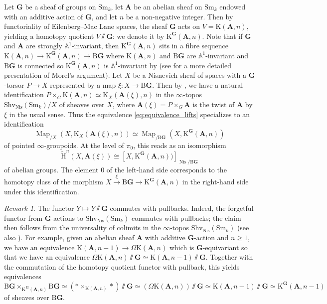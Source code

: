 \documentclass[11pt,leqno]{amsart}
\renewcommand{\1}{{\rm 1\hspace*{-0.4ex}%
\rule{0.1ex}{1.52ex}\hspace*{0.2ex}}}
\newcommand{\Nis}{{\operatorname{Nis}}}
\newcommand{\Shv}{{\mathrm{Shv}}}
\newcommand{\Sm}{\mathrm{Sm}}
\newcommand{\Hr}{{\mathrm {H}}}
\newcommand{\<}[1]{{\langle}#1 {\rangle}}
\newcommand{\Kr}{\mathrm{K}}
\newcommand{\Abf}{\mathbf{A}}
\newcommand{\Abb}{\mathbb{A}}
\newcommand{\Gbf}{\mathbf{G}}
\newcommand{\Br}{\mathrm{B}}
\newcommand{\Map}{\operatorname{Map}}
\theoremstyle{plain}
\theoremstyle{definition}
\theoremstyle{remark}
\newtheorem{rem}[thm]{Remark}
\numberwithin{equation}{section}
\begin{document}
Let $\Gbf$ be a sheaf of groups on $\Sm_k$, let $\Abf$ be an abelian sheaf on $\Sm_k$ endowed with an additive action of $\Gbf$, and let $n$ be a non-negative integer. Then by functoriality of Eilenberg--Mac Lane spaces, the sheaf $\Gbf$ acts on $V=\Kr(\Abf,n)$, yielding a homotopy quotient $V\sslash\Gbf$: we denote it by $\Kr^\Gbf(\Abf,n)$. Note that if $\Gbf$ and $\Abf$ are strongly $\Abb^1$-invariant, then $\Kr^\Gbf(\Abf,n)$ sits in a fibre sequence $\Kr(\Abf,n)\to\Kr^\Gbf(\Abf,n)\to\Br\Gbf$ where $\Kr(\Abf,n)$ and $\Br\Gbf$ are $\Abb^1$-invariant and $\Br\Gbf$ is connected so $\Kr^\Gbf(\Abf,n)$ is $\Abb^1$-invariant by \cite[Lemma 6.51]{morelA1AlgebraicTopologyField2012} (see \cite[Lemma 2.2.10]{asokSimplicialSuspensionSequence2017} for a more detailed presentation of Morel's argument). Let $X$ be a Nisnevich sheaf of spaces with a $\Gbf$-torsor $P\to X$ represented by a map $\xi:X\to\Br\Gbf$. Then by \cite[Lemma B.15]{morelA1AlgebraicTopologyField2012}, we have a natural identification $P\times_G\Kr(\Abf,n)\simeq\Kr_X(\Abf(\xi),n)$ in the $\infty$-topos $\Shv_\Nis(\Sm_k)/X$ of sheaves over $X$, where $\Abf(\xi)=P\times_G\Abf$ is the twist of $\Abf$ by $\xi$ in the usual sense. Thus the equivalence  \eqref{eq:equivalence_lifts} specializes to an identification \[\Map_{/X}(X,\Kr_X(\Abf(\xi),n))\simeq\Map_{/\Br\Gbf}(X,\Kr^\Gbf(\Abf,n))\] of pointed $\infty$-groupoids. At the level of $\pi_0$, this reads as an isomorphism 
\begin{equation}\label{eq:cohomology_lift_through_bg}
\widetilde{\Hr}^n(X,\Abf(\xi))\cong[X,\Kr^\Gbf(\Abf,n))]_{\Nis/\Br\Gbf}
\end{equation}
of abelian groups. The element $0$ of the left-hand side corresponds to the homotopy class of the morphism $X\xrightarrow{\xi}\Br\Gbf\to\Kr^\Gbf(\Abf,n)$ in the right-hand side under this identification.

\begin{rem}\label{rem:equivariant_loop_space}
The functor $Y\mapsto Y\sslash\Gbf$ commutes with pullbacks. Indeed, the forgetful functor from $\Gbf$-actions to $\Shv_\Nis(\Sm_k)$ commutes with pullbacks; the claim then follows from the universality of colimits in the $\infty$-topos $\Shv_\Nis(\Sm_k)$ (see also \cite[proof of Lemma 4.5]{nikolausPrincipalinftybundlesGeneral2015}). For example, given an abelian sheaf $\Abf$  with additive $\Gbf$-action and $n\geq 1$, we have an equivalence $\Kr(\Abf,n-1)\to\Omega\Kr(\Abf,n)$ which is $\Gbf$-equivariant so that we have an equivalence $\Omega\Kr(\Abf,n)\sslash\Gbf\simeq\Kr(\Abf,n-1)\sslash\Gbf$. Together with the commutation of the homotopy quotient functor with pullback, this yields equivalences \[\Br\Gbf\times_{\Kr^\Gbf(\Abf,n)}\Br\Gbf\simeq(*\times_{\Kr(\Abf,n)}*)\sslash\Gbf\simeq(\Omega\Kr(\Abf,n))\sslash\Gbf\simeq\Kr(\Abf,n-1)\sslash\Gbf\simeq\Kr^\Gbf(\Abf,n-1)\] of sheaves over $\Br\Gbf$. 
\end{rem}
\end{document}
